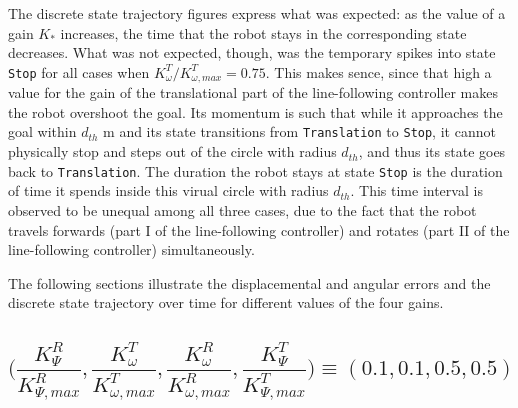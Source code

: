 The discrete state trajectory figures express what was expected: as the value
of a gain $K_{*}$ increases, the time that the robot stays in the corresponding
state decreases. What was not expected, though, was the temporary spikes into
state \texttt{Stop} for all cases when $K_{\omega}^T / K_{\omega,max}^T = 0.75$.
This makes sence, since that high a value for the gain of the translational
part of the line-following controller makes the robot overshoot the goal. Its
momentum is such that while it approaches the goal within $d_{th}$ m and its
state transitions from \texttt{Translation} to \texttt{Stop}, it cannot physically
stop and steps out of the circle with radius $d_{th}$, and thus its state goes back
to \texttt{Translation}. The duration the robot stays at state \texttt{Stop} is
the duration of time it spends inside this virual circle with radius $d_{th}$.
This time interval is observed to be unequal among all three cases, due to the
fact that the robot travels forwards (part I of the line-following controller)
and rotates (part II of the line-following controller) simultaneously.

The following sections illustrate the displacemental and angular errors and
the discrete state trajectory over time for different values of the four gains.


\subsection*{$\Bigg(
  \dfrac{K_{\Psi}^R}{K_{\Psi,max}^R},
  \dfrac{K_{\omega}^T}{K_{\omega,max}^T},
  \dfrac{K_{\omega}^R}{K_{\omega,max}^R},
  \dfrac{K_{\Psi}^T}{K_{\Psi,max}^T}\Bigg) \equiv (0.1, 0.1, 0.5, 0.5)$}

